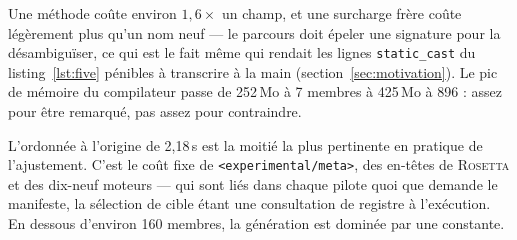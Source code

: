 \documentclass[11pt,a4paper]{article}
\newcommand{\rosetta}{\textsc{Rosetta}}
\newcommand{\code}[1]{\texttt{\small #1}}
\begin{document}
Une méthode coûte environ $1{,}6\times$ un champ, et une surcharge frère coûte
légèrement plus qu'un nom neuf --- le parcours doit épeler une signature pour la
désambiguïser, ce qui est le fait même qui rendait les lignes \code{static\_cast}
du listing~\ref{lst:five} pénibles à transcrire à la main
(section~\ref{sec:motivation}). Le pic de mémoire du compilateur passe de
252\,Mo à 7 membres à 425\,Mo à 896 : assez pour être remarqué, pas assez pour
contraindre.

L'ordonnée à l'origine de 2,18\,s est la moitié la plus pertinente en pratique de
l'ajustement. C'est le coût fixe de \code{<experimental/meta>}, des en-têtes de
\rosetta{} et des dix-neuf moteurs --- qui sont liés dans chaque pilote quoi que
demande le manifeste, la sélection de cible étant une consultation de registre à
l'exécution. En dessous d'environ 160 membres, la génération est dominée par une
constante.
\end{document}
